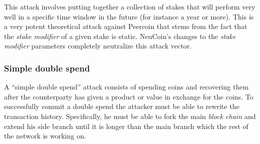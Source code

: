 \documentclass[a4paper,11pt]{article}
\begin{document}
\begin{enumerate}
{This attack involves putting together a collection of stakes that will perform very well in a specific time window in the future (for instance a year or more). This is a very potent theoretical attack against Peercoin that stems from the fact that the \textit{stake modifier} of a given stake is static. NeuCoin's changes to the \textit{stake modifier} parameters completely neutralize this attack vector.}
\end{enumerate}



\subsubsection{Simple double spend}
\label{331}

A ``simple double spend'' attack consists of spending coins and recovering them after the counterparty has given a product or value in exchange for the coins. To successfully commit a double spend the attacker must be able to rewrite the transaction history. Specifically, he must be able to fork the main \textit{block chain} and extend his side branch until it is longer than the main branch which the rest of the network is working on.
\end{document}
